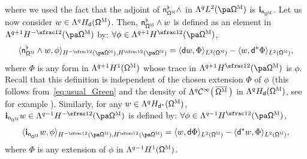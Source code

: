 where we used the fact that the adjoint of $\mathsf n_{\mathsf \Omega^{\textsc{M}}}^\flat\wedge$ in $\Lambda^qL^2 (\pa \mathsf \Omega^{\textsc{M}})$ is $\mathbf i_{\mathsf n_{\mathsf \Omega^{\textsc{M}}}}$. Let us now consider $w \in \Lambda^q
H_{\mathsf d} (\mathsf \Omega^{\textsc{M}})$. Then, $\mathsf
n_{\mathsf \Omega^{\textsc{M}}}^\flat \wedge w$ is defined as an
element in $ \Lambda^{q+1} H^{-\sfrac12} (\pa\mathsf
\Omega^{\textsc{M}})$ by: $\forall \phi \in\Lambda^{q+1}H^{\sfrac12}
(\pa\mathsf \Omega^{\textsc{M}})$,
\begin{equation}
\label{eq.n-wedge-u}
\langle \mathsf n_{\mathsf \Omega^{\textsc{M}}}^\flat \wedge w, \phi \rangle_{H^{-\sfrac12} (\pa\mathsf \Omega^{\textsc{M}}),H^{\sfrac12} (\pa\mathsf \Omega^{\textsc{M}})} =
\langle \mathsf d w, \Phi \rangle_{ L^2 (\mathsf \Omega^{\textsc{M}})}-\langle w, \mathsf d^*\Phi\rangle_{ L^2 (\mathsf \Omega^{\textsc{M}})},
\end{equation}
where $\Phi$ is any form in $\Lambda^{q+1}H^{1} (\mathsf \Omega^{\textsc{M}})$ whose trace
in $\Lambda^{q+1}H^{\sfrac12} (\pa\mathsf \Omega^{\textsc{M}})$ is $\phi$. Recall that this definition is independent of the chosen extension $\Phi$ of $\phi$ (this follows from~\eqref{eq:usual_Green} and the density of $\Lambda^q\mathcal C^\infty\bigl(\, \overline{\mathsf \Omega^{\textsc{M}}}\, \bigr)$
in $\Lambda^q H_{\mathsf d} (\mathsf \Omega^{\textsc{M}})$, see
for example
\cite[Prop.\,3.1]{jakab-mitrea-mitrea-09}). Similarly, for any
$w \in \Lambda^q H_{\mathsf d^*} (\mathsf \Omega^{\textsc{M}})$,
$\mathbf{i}_{\mathsf n_{\mathsf \Omega^{\textsc{M}}}} w\in
\Lambda^{q-1}H^{-\sfrac12} (\pa\mathsf \Omega^{\textsc{M}})$
is defined by: $\forall \phi \in \Lambda^{q-1} H^{\sfrac12} (\pa\mathsf \Omega^{\textsc{M}})$,
\begin{equation}
\label{eq.i-n-u}
\langle \mathbf{i}_{\mathsf n_{\mathsf \Omega^{\textsc{M}}}} w, \phi \rangle_{H^{-\sfrac12} (\pa\mathsf \Omega^{\textsc{M}}),H^{\sfrac12} (\pa\mathsf \Omega^{\textsc{M}})} =
\langle w, \mathsf d\Phi\rangle_{ L^2 (\mathsf \Omega^{\textsc{M}})}-\langle \mathsf d^*w, \Phi\rangle_{ L^2 (\mathsf \Omega^{\textsc{M}})},
\end{equation}
where $\Phi$ is any extension of $\phi$ in $\Lambda^{q-1}H^{1} (\mathsf \Omega^{\textsc{M}})$.

